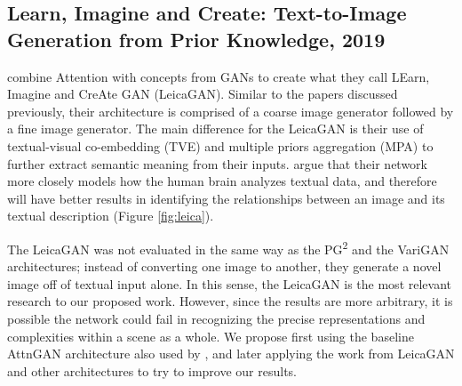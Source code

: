 \documentclass[letterpaper]{article} %
\begin{document}
\cite{attention_caption}

\subsection{Learn, Imagine and Create: Text-to-Image Generation from Prior 
Knowledge, 2019}
\nocite{leica}
\cite{leica} combine Attention with concepts from GANs to create what they call
LEarn, Imagine and CreAte GAN (LeicaGAN). Similar to the papers discussed
previously, their architecture is comprised of a coarse image generator followed
by a fine image generator. The main difference for the LeicaGAN is their use
of textual-visual co-embedding (TVE) and multiple priors aggregation (MPA)
to further extract semantic meaning from their inputs. \cite{leica} argue that
their network more closely models how the human brain analyzes textual data,
and therefore will have better results in identifying the relationships between
an image and its textual description (Figure \ref{fig:leica}).

The LeicaGAN was not evaluated in the same way as the PG\textsuperscript{2} and
the VariGAN architectures; instead of converting one image to another, they
generate a novel image off of textual input alone. In this sense, the LeicaGAN
is the most relevant research to our proposed work. However, since the results
are more arbitrary, it is possible the network could fail in recognizing the
precise representations and complexities within a scene as a whole.
We propose first using the baseline AttnGAN architecture also used by 
\cite{leica}, and later applying the work from LeicaGAN and other architectures 
to try to improve our results.

%




\end{document}
